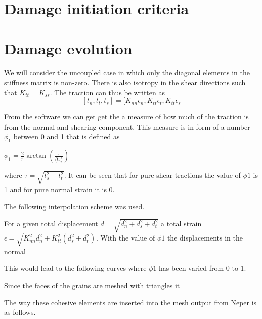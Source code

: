 \documentclass[generate_interface_elements.tex]{subfiles}
\begin{document}
\section{Damage initiation criteria}

\section{Damage evolution}



We will consider the uncoupled case in which only the diagonal elements in the stiffness matrix is non-zero. There is also isotropy in the shear directions such that $K_{tt} = K_{ss}$. The traction can thus be written as
\[ [t_n, t_t, t_s] = [K_{nn} \epsilon_n, K_{tt} \epsilon_t, K_{tt} \epsilon_s \]

From the software we can get get the a measure of how much of the traction is from the normal and shearing component. This measure is in form of a number $\phi_1$ between 0 and 1 that is defined as

$ \phi_1 = \frac{2}{\pi} \arctan \left( \frac{\tau}{\langle t_n \rangle} \right) $

where $ \tau = \sqrt{t_s^2 + t_t^2}$. It can be seen that for pure shear tractions the value of $\phi1$ is 1 and for pure normal strain it is 0. 

The following interpolation scheme was used.

For a given total displacement $d = \sqrt{d_n^2 + d_s^2 + d_t^2}$ a total strain $\epsilon = \sqrt{K^2_{nn} d_n^2 + K^2_{tt} \left(d_s^2 + d_t^2 \right)}$. With the value of $ \phi1$ the displacements in the normal 


This would lead to the following curves where $\phi1$ has been varied from 0 to 1.



Since the faces of the grains are meshed with triangles it 


The way these cohesive elements are inserted into the mesh output from Neper is as follows. 
\end{document}
